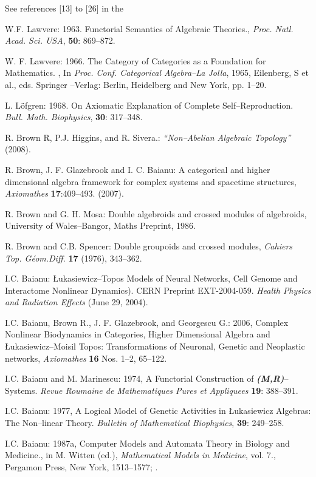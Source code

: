 \documentclass[12pt]{article}
\theoremstyle{plain}
\theoremstyle{definition}
\numberwithin{equation}{section}
\begin{document}
\begin{thebibliography}{9}

See references [13] to [26] in the 

W.F. Lawvere: 1963. Functorial Semantics of Algebraic Theories., \emph{Proc. Natl. Acad. Sci. USA}, \textbf{50}: 869--872.

W. F. Lawvere: 1966. The Category of Categories as a Foundation for Mathematics. , In \emph{Proc. Conf. Categorical Algebra--La Jolla}, 1965, Eilenberg, S et al., eds. Springer --Verlag: Berlin, Heidelberg and New York, pp. 1--20.

L. L\"ofgren: 1968. On Axiomatic Explanation of Complete Self--Reproduction. \emph{Bull. Math. Biophysics}, 
\textbf{30}: 317--348. 

R. Brown R, P.J. Higgins, and R. Sivera.: \textit{``Non--Abelian Algebraic Topology''} (2008).
 
R. Brown, J. F. Glazebrook and I. C. Baianu: A categorical and higher dimensional algebra framework for complex systems and spacetime structures, \emph{Axiomathes} \textbf{17}:409--493.
(2007).

R. Brown and G. H. Mosa: Double algebroids and crossed modules of algebroids, University of Wales--Bangor, Maths Preprint, 1986.

R. Brown  and C.B. Spencer: Double groupoids and crossed modules, \emph{Cahiers Top. G\'eom.Diff.} \textbf{17} (1976), 343--362.

I.C. Baianu: \L ukasiewicz--Topos Models of Neural Networks, Cell Genome and Interactome Nonlinear Dynamics). CERN Preprint EXT-2004-059. \textit{Health Physics and Radiation Effects} (June 29, 2004). 

I.C. Baianu, Brown R., J. F. Glazebrook, and Georgescu G.: 2006, Complex Nonlinear Biodynamics in 
Categories, Higher Dimensional Algebra and \L ukasiewicz--Moisil Topos: Transformations of
Neuronal, Genetic and Neoplastic networks, \emph{Axiomathes} \textbf{16} Nos. 1--2, 65--122.

I.C. Baianu and M. Marinescu: 1974, A Functorial Construction of \emph{\textbf{(M,R)}}-- Systems. \emph{Revue Roumaine de Mathematiques Pures et Appliquees} \textbf{19}: 388--391.

I.C. Baianu: 1977, A Logical Model of Genetic Activities in \L ukasiewicz Algebras: The Non--linear Theory. \emph{Bulletin of Mathematical Biophysics}, \textbf{39}: 249--258.

I.C. Baianu: 1987a, Computer Models and Automata Theory in Biology and Medicine.,  in M. Witten (ed.), 
\emph{Mathematical Models in Medicine}, vol. 7., Pergamon Press, New York, 1513--1577;
.
\end{thebibliography}
\end{document}
